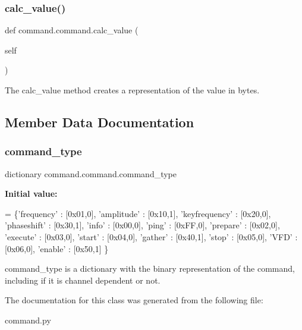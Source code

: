 \subsubsection{\texorpdfstring{calc\+\_\+value()}{calc\_value()}}
{\footnotesize\ttfamily def command.\+command.\+calc\+\_\+value (\begin{DoxyParamCaption}\item[{}]{self }\end{DoxyParamCaption})}



The calc\+\_\+value method creates a representation of the value in bytes. 



\subsection{Member Data Documentation}
\mbox{\label{classcommand_1_1command_a5b96dc7d87263930faa4fa46cdd79412}} 
\subsubsection{\texorpdfstring{command\+\_\+type}{command\_type}}
{\footnotesize\ttfamily dictionary command.\+command.\+command\+\_\+type\hspace{0.3cm}{\ttfamily [static]}}

{\bfseries Initial value\+:}
\begin{DoxyCode}
=  \{\textcolor{stringliteral}{'frequency'}     : [0x01,0],
                    \textcolor{stringliteral}{'amplitude'}     : [0x10,1],
                    \textcolor{stringliteral}{'keyfrequency'}  : [0x20,0],
                    \textcolor{stringliteral}{'phaseshift'}    : [0x30,1],
                    \textcolor{stringliteral}{'info'}          : [0x00,0],
                    \textcolor{stringliteral}{'ping'}          : [0xFF,0],
                    \textcolor{stringliteral}{'prepare'}       : [0x02,0],
                    \textcolor{stringliteral}{'execute'}       : [0x03,0],
                    \textcolor{stringliteral}{'start'}         : [0x04,0],
                    \textcolor{stringliteral}{'gather'}        : [0x40,1],
                    \textcolor{stringliteral}{'stop'}          : [0x05,0],
                    \textcolor{stringliteral}{'VFD'}           : [0x06,0],
                    \textcolor{stringliteral}{'enable'}        : [0x50,1]
                    \}
\end{DoxyCode}


command\+\_\+type is a dictionary with the binary representation of the command, including if it is channel dependent or not. 



The documentation for this class was generated from the following file\+:\begin{DoxyCompactItemize}
\item 
command.\+py\end{DoxyCompactItemize}
